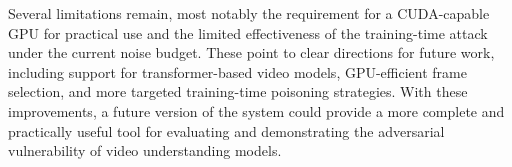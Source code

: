 Several limitations remain, most notably the
requirement for a CUDA-capable GPU for practical
use and the limited effectiveness of the
training-time attack under the current noise
budget. These point to clear directions for
future work, including support for
transformer-based video models, GPU-efficient
frame selection, and more targeted training-time
poisoning strategies. With these improvements,
a future version of the system could provide a
more complete and practically useful tool for
evaluating and demonstrating the adversarial
vulnerability of video understanding models.
